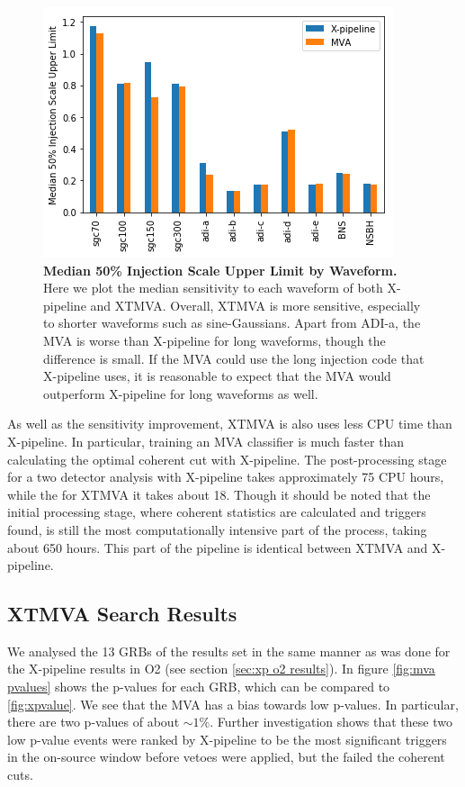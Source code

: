 \documentclass[11pt]{cuthesis}
\newcommand{\xp}{X-pipeline }
\newcommand{\xpfs}{X-pipeline. }
\begin{document}
\begin{figure} %
\begin{center}
\includegraphics[width=1.0\linewidth]{median_50pc_injscale.png}
\end{center}
\caption{\textbf{Median 50\% Injection Scale Upper Limit by Waveform.} Here we plot the median sensitivity to each waveform of both \xp and XTMVA. Overall, XTMVA is more sensitive, especially to shorter waveforms such as sine-Gaussians. Apart from ADI-a, the MVA is worse than \xp for long waveforms, though the difference is small. If the MVA could use the long injection code that \xp uses, it is reasonable to expect that the MVA would outperform \xp for long waveforms as well. }
\label{fig:median injscale}
\end{figure}

As well as the sensitivity improvement, XTMVA is also uses less CPU time than \xpfs In particular, training an MVA classifier is much faster than calculating the optimal coherent cut with \xpfs The post-processing stage for a two detector analysis with \xp takes approximately 75 CPU hours, while the for XTMVA it takes about 18. Though it should be noted that the initial processing stage, where coherent statistics are calculated and triggers found, is still the most computationally intensive part of the process, taking about 650 hours. This part of the pipeline is identical between XTMVA and \xpfs

\subsection{XTMVA Search Results} \label{sec:mva results}
We analysed the 13 GRBs of the results set in the same manner as was done for the \xp results in O2 (see section \ref{sec:xp o2 results}). In figure \ref{fig:mva pvalues} shows the p-values for each GRB, which can be compared to \ref{fig:xpvalue}. We see that the MVA has a bias towards low p-values. In particular, there are two p-values of about $\sim1\%$. Further investigation shows that these two low p-value events were ranked by \xp to be the most significant triggers in the on-source window before vetoes were applied, but the failed the coherent cuts. 
\end{document}
